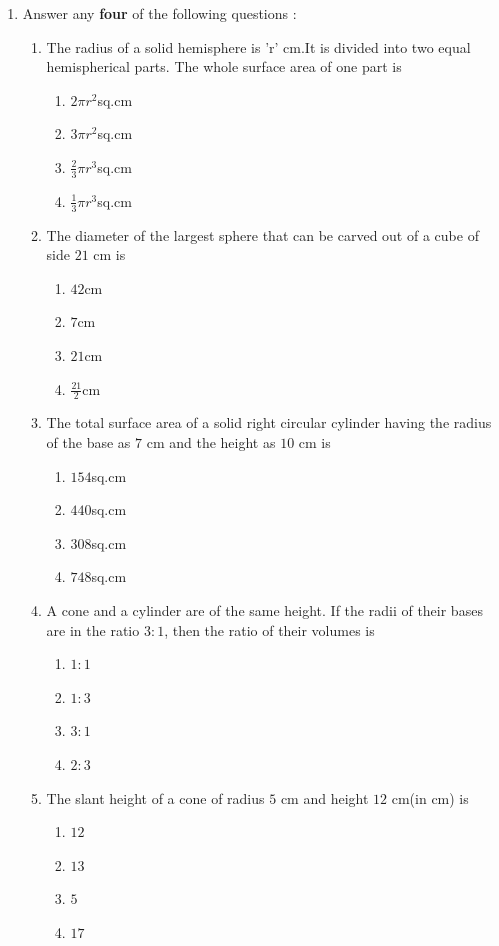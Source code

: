 \begin{enumerate}
\item Answer any \textbf{four} of the following questions :
\begin{enumerate}[label=(\roman*)]

    \item The radius of a solid hemisphere is 'r' cm.It is divided into two equal hemispherical parts. The whole surface area of one part is
    \begin{enumerate} [label=(\Alph*)]
        \item $2\pi{r}^2$sq.cm
        \item $3\pi{r}^2$sq.cm
        \item $\frac{2}{3}\pi{r}^3$sq.cm
        \item $\frac{1}{3}\pi{r}^3$sq.cm

\end{enumerate} 

 
\item The diameter of the largest sphere that can be carved out
of a cube of side $21$ cm is
\begin{enumerate} [label=(\Alph*)]
        \item $42$cm
        \item $7$cm
        \item $21$cm
        \item $\frac{21}{2}$cm
\end{enumerate}
\item The total surface area of a solid right circular cylinder
having the radius of the base as $7$ cm and the height as
$10$ cm is
\begin{enumerate} [label=(\Alph*)]
        \item $154$sq.cm
        \item $440$sq.cm
        \item $308$sq.cm
        \item $748$sq.cm
\end{enumerate}
\item A cone and a cylinder are of the same height. If the radii
of their bases are in the ratio $3 : 1$, then the ratio of their
volumes is
\begin{enumerate} [label=(\Alph*)]
        \item $1:1$
        \item $1:3$
        \item $3:1$
        \item $2:3$
\end{enumerate}
\item The slant height of a cone of radius $5$ cm and height $12$ cm(in cm) is
\begin{enumerate} [label=(\Alph*)]
        \item $12$
        \item $13$
        \item $5$
        \item $17$
\end{enumerate}
\end{enumerate}


\end{enumerate}
